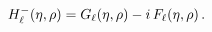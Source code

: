 $\mathop{{H^{-}_{\ell}}\/}\nolimits\!\left(\eta,\rho\right)=\mathop{G_{\ell}\/}%
\nolimits\!\left(\eta,\rho\right)-i\mathop{F_{\ell}\/}\nolimits\!\left(\eta,%
\rho\right).$